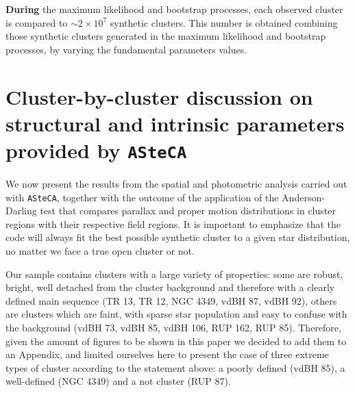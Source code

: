 \documentclass[draft]{aa}
\begin{document}
\textbf{During} the maximum likelihood and bootstrap processes,
each observed cluster is compared to $\sim2\times10^7$
synthetic clusters. This number is obtained combining those synthetic
clusters generated in the maximum likelihood and bootstrap processes, by
varying the fundamental parameters values.




\section{Cluster-by-cluster discussion on structural and intrinsic parameters
provided by \texttt{ASteCA}}
\label{sec:cluster_discuss}

We now present the results from the spatial and photometric analysis
carried out with \texttt{ASteCA}, together with the outcome of the application
of the Anderson-Darling test that compares parallax and proper motion
distributions in cluster regions with their respective field regions.
It is important to emphasize that the code will always fit the
best possible synthetic cluster to a given star distribution, no matter we
face a true open cluster or not.

Our sample contains clusters with a large variety of properties: some are
robust, bright, well detached from the cluster background and therefore with a
clearly defined main sequence (TR 13, TR 12, NGC 4349, vdBH 87, vdBH 92),
others are clusters which are faint, with sparse star population and easy to
confuse with the background (vdBH 73, vdBH 85, vdBH 106, RUP 162, RUP 85).
Therefore, given the amount of figures to be shown in this paper we decided to
add them to an Appendix, and limited ourselves here to present
the case of three extreme types of cluster according to the statement
above: a poorly defined (vdBH 85), a well-defined (NGC 4349) and a not
cluster (RUP 87).
\end{document}

